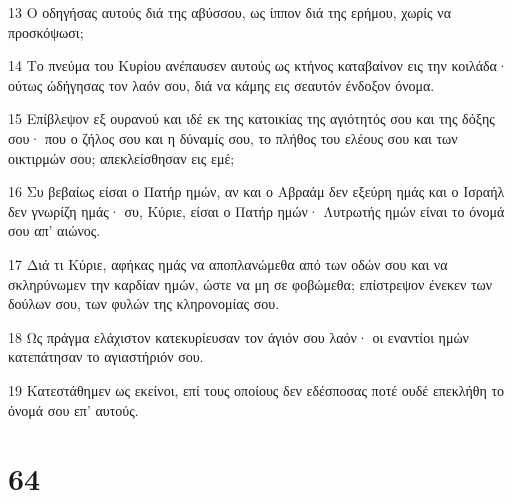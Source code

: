 \par 13 Ο οδηγήσας αυτούς διά της αβύσσου, ως ίππον διά της ερήμου, χωρίς να προσκόψωσι;
\par 14 Το πνεύμα του Κυρίου ανέπαυσεν αυτούς ως κτήνος καταβαίνον εις την κοιλάδα· ούτως ώδήγησας τον λαόν σου, διά να κάμης εις σεαυτόν ένδοξον όνομα.
\par 15 Επίβλεψον εξ ουρανού και ιδέ εκ της κατοικίας της αγιότητός σου και της δόξης σου· που ο ζήλος σου και η δύναμίς σου, το πλήθος του ελέους σου και των οικτιρμών σου; απεκλείσθησαν εις εμέ;
\par 16 Συ βεβαίως είσαι ο Πατήρ ημών, αν και ο Αβραάμ δεν εξεύρη ημάς και ο Ισραήλ δεν γνωρίζη ημάς· συ, Κύριε, είσαι ο Πατήρ ημών· Λυτρωτής ημών είναι το όνομά σου απ' αιώνος.
\par 17 Διά τι Κύριε, αφήκας ημάς να αποπλανώμεθα από των οδών σου και να σκληρύνωμεν την καρδίαν ημών, ώστε να μη σε φοβώμεθα; επίστρεψον ένεκεν των δούλων σου, των φυλών της κληρονομίας σου.
\par 18 Ως πράγμα ελάχιστον κατεκυρίευσαν τον άγιόν σου λαόν· οι εναντίοι ημών κατεπάτησαν το αγιαστήριόν σου.
\par 19 Κατεστάθημεν ως εκείνοι, επί τους οποίους δεν εδέσποσας ποτέ ουδέ επεκλήθη το όνομά σου επ' αυτούς.

\chapter{64}

